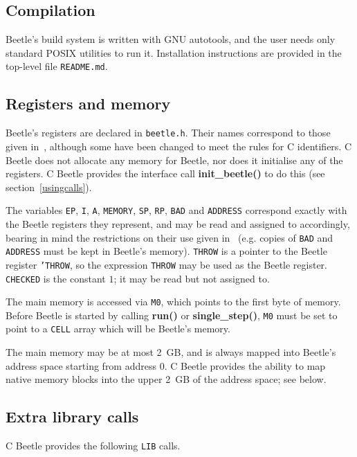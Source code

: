 \documentclass[english]{article}
\begin{document}
\subsection{Compilation}

Beetle's build system is written with GNU autotools, and the user
needs only standard POSIX utilities to run it. Installation
instructions are provided in the top-level file {\tt README.md}.


\subsection{Registers and memory}

Beetle's registers are declared in {\tt beetle.h}. Their names correspond to
those given in~\cite[section~2.1]{beetle}, although some have been changed
to meet the rules for C identifiers. C Beetle does not allocate any
memory for Beetle, nor does it initialise any of the registers. C Beetle
provides the interface call {\bf init\_beetle()} to do this (see
section~\ref{usingcalls}).

The variables {\tt EP}, {\tt I}, {\tt A}, {\tt MEMORY}, {\tt SP}, {\tt RP}, {\tt BAD} and {\tt ADDRESS}
correspond exactly with the Beetle registers they represent, and may be read
and assigned to accordingly, bearing in mind the restrictions on their use
given in~\cite{beetle} (e.g. copies of {\tt BAD} and {\tt ADDRESS} must be
kept in Beetle's memory). {\tt THROW} is a pointer to the Beetle register
{\tt 'THROW}, so the expression {\tt *THROW} may be used as the Beetle
register. {\tt CHECKED} is the constant $1$; it may be read but not
assigned to.

The main memory is accessed via {\tt M0}, which points to the first byte of
memory. Before Beetle is started by calling {\bf run()} or {\bf
single\_step()}, {\tt M0} must be set to point to a {\tt CELL} array which will be
Beetle's memory.

The main memory may be at most \SI{2}{GB}, and is always mapped into Beetle’s address space starting from address $0$. C Beetle provides the ability to map native memory blocks into the upper \SI{2}{GB} of the address space; see below.


\subsection{Extra library calls}

C Beetle provides the following {\tt LIB} calls.
\end{document}

